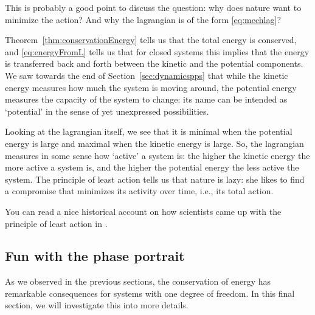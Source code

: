 \documentclass[english,fontsize=11pt,paper=a5,oneside]{scrbook}
\theoremstyle{definition}
\newenvironment{remark}
  {\pushQED{\qed}\renewcommand{\qedsymbol}{$\lozenge$}\remarkx}
  {\popQED\endremarkx}
\begin{document}
\begin{remark}
  This is probably a good point to discuss the question: why does nature want to minimize the action? And why the lagrangian is of the form \eqref{eq:mechlag}?

  Theorem~\ref{thm:conservationEnergy} tells us that the total energy is conserved, and \eqref{eq:energyFromL} tells us that for closed systems this implies that the energy is transferred back and forth between the kinetic and the potential components.
  We saw towards the end of Section~\ref{sec:dynamicspps} that while the kinetic energy measures how much the system is moving around, the potential energy measures the capacity of the system to change: its name can be intended as `potential' in the sense of yet unexpressed possibilities.

  Looking at the lagrangian itself, we see that it is minimal when the potential energy is large and maximal when the kinetic energy is large.
  So, the lagrangian measures in some sense how `active' a system is: the higher the kinetic energy the more active a system is, and the higher the potential energy the less active the system.
  The principle of least action tells us that nature is lazy: she likes to find a compromise that minimizes its activity over time, i.e., its total action.

  You can read a nice historical account on how scientists came up with the principle of least action in \cite{lectures:baez}.
\end{remark}



\subsection{Fun with the phase portrait}\label{sec:1deg-again}

As we observed in the previous sections, the conservation of energy has remarkable consequences for systems with one degree of freedom.
In this final section, we will investigate this into more details.
\end{document}
